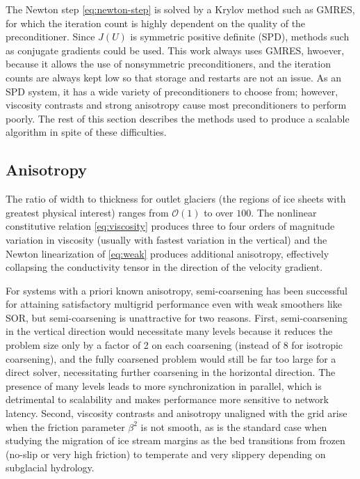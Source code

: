 \documentclass[3p]{elsarticle}
\newcommand{\bigO}{{\mathcal{O}}}
\begin{document}
The Newton step \eqref{eq:newton-step} is solved by a Krylov method such as GMRES, for which the iteration count is highly dependent on the quality of the preconditioner.  Since $J(U)$ is symmetric positive definite (SPD), methods such as conjugate gradients could be used. This work always uses GMRES, hwoever, because it allows the use of nonsymmetric preconditioners, and the iteration counts are always kept low so that storage and restarts are not an issue.  As an SPD system, it has a wide variety of preconditioners to choose from; however, viscosity contrasts and strong anisotropy cause most preconditioners to perform poorly.  The rest of this section describes the methods used to produce a scalable algorithm in spite of these difficulties.

\subsection{Anisotropy}
The ratio of width to thickness for outlet glaciers (the regions of ice sheets with greatest physical interest) ranges from $\bigO(1)$ to over $100$.  The nonlinear constitutive relation \eqref{eq:viscosity} produces three to four orders of magnitude variation in viscosity (usually with fastest variation in the vertical) and the Newton linearization of \eqref{eq:weak} produces additional anisotropy, effectively collapsing the conductivity tensor in the direction of the velocity gradient.

For systems with a priori known anisotropy, semi-coarsening has been successful for attaining
satisfactory multigrid performance even with weak smoothers like SOR, but semi-coarsening is
unattractive for two reasons.  First, semi-coarsening in the vertical direction would necessitate
many levels because it reduces the problem size only by a factor of 2 on each coarsening (instead of
8 for isotropic coarsening), and the fully coarsened problem would still be far too large for a
direct solver, necessitating further coarsening in the horizontal direction.  The presence of many
levels leads to more synchronization in parallel, which is detrimental to scalability and makes
performance more sensitive to network latency.  Second, viscosity contrasts and anisotropy
unaligned with the grid arise when the friction parameter $\beta^2$ is not smooth, as is the standard
case when studying the migration of ice stream margins as the bed transitions from frozen (no-slip
or very high friction) to temperate and very slippery depending on subglacial hydrology.
\end{document}
